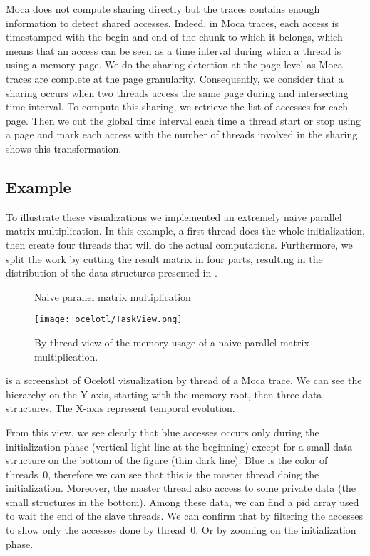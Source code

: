 \gls{Moca} does not compute sharing directly but the traces contains enough information to detect shared accesses.
Indeed, in \gls{Moca} traces, each access is timestamped with the begin and end of the chunk to which it belongs, which means that an access can be seen as a time interval during which a thread is using a memory page.
We do the sharing detection at the page level as \gls{Moca} traces are complete at the page granularity.
Consequently, we consider that a sharing occurs when two threads access the same page during and intersecting time interval.
To compute this sharing, we retrieve the list of accesses for each page.
Then we cut the global time interval each time a thread start or stop using a page and mark each access with the number of threads involved in the sharing.
 shows this transformation.

\subsection{Example}

To illustrate these visualizations we implemented an extremely naive parallel matrix multiplication.
In this example, a first thread does the whole initialization, then create four threads that will do the actual computations.
Furthermore, we split the work by cutting the result matrix in four parts, resulting in the distribution of the data structures presented in .

\begin{figure}[htb]
    \centering
    
    \caption{Naive parallel matrix multiplication}
    \label{fig:mat-mult-par}
\end{figure}

\begin{figure}[htb]
    \centering
    \texttt{[image: ocelotl/TaskView.png]}
    \caption{By thread view of the memory usage of a naive parallel matrix multiplication.}
    \label{fig:ocelotl-th0}
\end{figure}

 is a screenshot of \gls{Ocelotl} visualization by thread of a \gls{Moca} trace.
We can see the hierarchy on the Y-axis, starting with the memory root, then three data structures.
The X-axis represent temporal evolution.

From this view, we see clearly that  blue accesses occurs only during the initialization phase (vertical light line at the beginning) except for a small data structure on the bottom of the figure (thin dark line).
Blue is the color of threads~$0$, therefore we can see that this is the master thread doing the initialization.
Moreover, the master thread also access to some private data (the small structures in the bottom).
Among these data, we can find a pid array used to wait the end of the slave threads.
We can confirm that by filtering the accesses to show only the accesses done by thread~$0$.
Or by zooming on the initialization phase.

